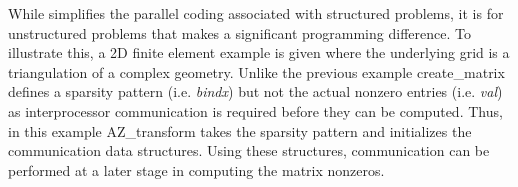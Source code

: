 While \Az{} simplifies the parallel coding associated with structured problems,
it is for unstructured problems that \Az{} makes a significant programming
difference. To illustrate this, a 2D finite element example is given where the
underlying grid is a triangulation of a complex geometry. Unlike the previous
example
{\sf create\_matrix} defines a sparsity pattern (i.e. {\it bindx\/}) but not
the actual nonzero entries (i.e. {\it val\/}) as interprocessor communication
is required before they can be computed.  Thus, in this example {\sf
  AZ\_transform} takes the sparsity pattern and initializes the communication
data structures. Using these structures, communication can be performed at a
later stage in computing the matrix nonzeros.

